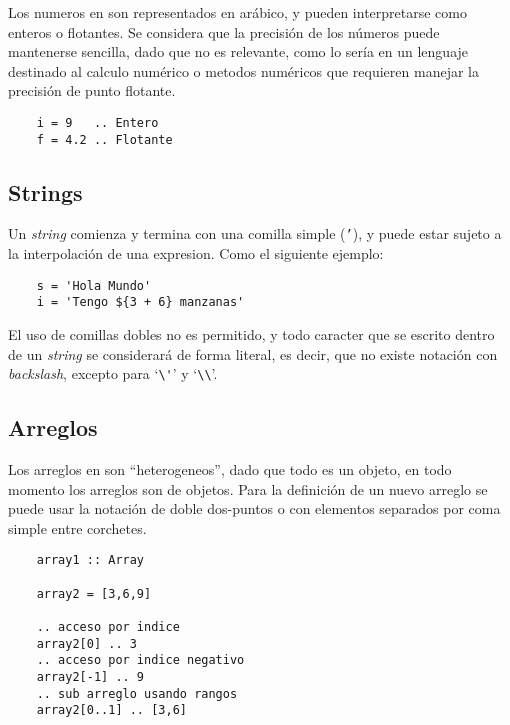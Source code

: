 \documentclass[12pt,letterpaper,titlepage,oneside,openright]{book}
\newcommand{\OhTeX}{%
    \makebox[0.76em][c]{O}%
    \makebox[0.25em][c]{%
        \raisebox{0.14em}[0em][0em]{%
            \fontsize{0.5em}{0cm}%
                \selectfont H%
        }%
    }%
    \makebox[1.35em][c]{\TeX}%
}
\newcommand{\ohtex}{\OhTeX\xspace}
\newcommand{\ttcode}[1]{(\texttt{#1})}
\begin{document}
Los numeros en \ohtex son representados en arábico, y pueden interpretarse como enteros o flotantes. Se considera que la precisión de los números puede mantenerse sencilla, dado que no es relevante, como lo sería en un lenguaje destinado al calculo numérico o metodos numéricos que requieren manejar la precisión de punto flotante.

\begin{center}
\begin{minipage}{\linewidth}
\begin{lstlisting}
    i = 9   .. Entero
    f = 4.2 .. Flotante
\end{lstlisting}
\end{minipage}
\end{center}

\subsection{Strings}

Un \textit{string} comienza y termina con una comilla simple \ttcode{'}, y puede estar sujeto a la interpolación de una expresion. Como el siguiente ejemplo:

\begin{center}
\begin{minipage}{\linewidth}
\begin{lstlisting}
    s = 'Hola Mundo'
    i = 'Tengo ${3 + 6} manzanas'
\end{lstlisting}
\end{minipage}
\end{center}

El uso de comillas dobles no es permitido, y todo caracter que se escrito dentro de un \textit{string} se considerará de forma literal, es decir, que no existe notación con \textit{backslash}, excepto para `\verb$\'$' y `\verb$\\$'.

\subsection{Arreglos}

Los arreglos en \ohtex son ``heterogeneos'', dado que todo es un objeto, en todo momento los arreglos son de objetos. Para la definición de un nuevo arreglo se puede usar la notación de doble dos-puntos o con elementos separados por coma simple entre corchetes.

\begin{center}
\begin{minipage}{\linewidth}
\begin{lstlisting}
    array1 :: Array

    array2 = [3,6,9]

    .. acceso por indice
    array2[0] .. 3
    .. acceso por indice negativo
    array2[-1] .. 9
    .. sub arreglo usando rangos
    array2[0..1] .. [3,6] 
\end{lstlisting}
\end{minipage}
\end{center}
\end{document}

